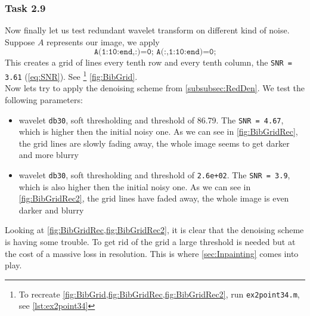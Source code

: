 \documentclass[a4paper]{article}
\begin{document}
    \subsubsection{Task 2.9} \label{subsubsec:Grid}

	Now finally let us test redundant wavelet transform on different kind of noise. Suppose $A$ represents our image, we apply
	\begin{equation*}
		\texttt{A(1:10:end,:)=0; A(:,1:10:end)=0;}
	\end{equation*}
	This creates a grid of lines every tenth row and every tenth column, the \texttt{SNR = 3.61} (\cref{eq:SNR}). See \footnote{To recreate \cref{fig:BibGrid,fig:BibGridRec,fig:BibGridRec2}, run \texttt{ex2point34.m}, see \cref{lst:ex2point34}} \cref{fig:BibGrid}.\\
	
	Now lets try to apply the denoising scheme from \cref{subsubsec:RedDen}. We test the following parameters: 
	\begin{itemize}
		\item wavelet \texttt{db30}, soft thresholding and threshold of 86.79. The \texttt{SNR = 4.67}, which is higher then the initial noisy one. As we can see in \cref{fig:BibGridRec}, the grid lines are slowly fading away, the whole image seems to get darker and more blurry
		\item wavelet \texttt{db30}, soft thresholding and threshold of \texttt{2.6e+02}. The \texttt{SNR = 3.9}, which is also higher then the initial noisy one. As we can see in \cref{fig:BibGridRec2}, the grid lines have faded away, the whole image is even darker and blurry 
	\end{itemize}

	Looking at \cref{fig:BibGridRec,fig:BibGridRec2}, it is clear that the denoising scheme is having some trouble. To get rid of the grid a large threshold is needed but at the cost of a massive loss in resolution. This is where \cref{sec:Inpainting} comes into play.
\end{document}
